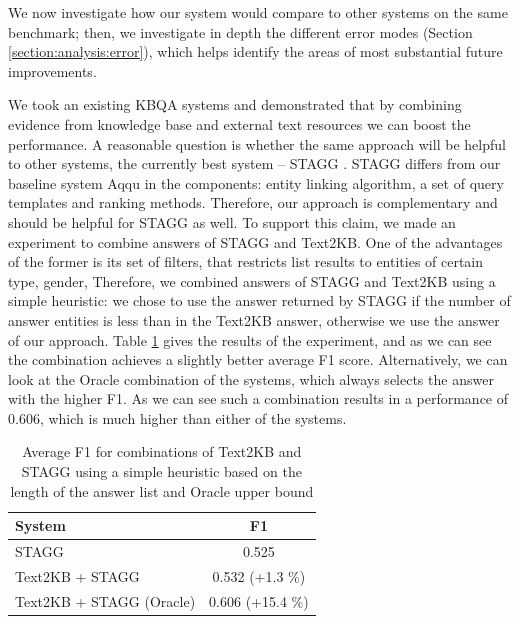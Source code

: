 We now investigate how our system would compare to other systems on the same benchmark; then, we investigate in depth the different error modes (Section \ref{section:analysis:error}), which helps identify the areas of most substantial future improvements. 

We took an existing KBQA systems and demonstrated that by combining evidence from knowledge base and external text resources we can boost the performance.
A reasonable question is whether the same approach will be helpful to other systems, \eg the currently best system -- STAGG \cite{yih2015semantic}.
STAGG differs from our baseline system Aqqu in the components: entity linking algorithm, a set of query templates and ranking methods.
Therefore, our approach is complementary and should be helpful for STAGG as well.
To support this claim, we made an experiment to combine answers of STAGG and Text2KB.
One of the advantages of the former is its set of filters, that restricts list results to entities of certain type, gender, \etc
Therefore, we combined answers of STAGG and Text2KB using a simple heuristic: we chose to use the answer returned by STAGG if the number of answer entities is less than in the Text2KB answer, otherwise we use the answer of our approach.
Table \ref{table:combine_stagg} gives the results of the experiment, and as we can see the combination achieves a slightly better average F1 score.
Alternatively, we can look at the Oracle combination of the systems, which always selects the answer with the higher F1.
As we can see such a combination results in a performance of 0.606, which is much higher than either of the systems.

\begin{table}
\centering
\begin{tabular}{| p{4.5cm} | c | }
\hline
System  & F1 \\
\hline
STAGG \cite{yih2015semantic} & 0.525\\
Text2KB + STAGG & 0.532 (+1.3 \%) \\
Text2KB + STAGG (Oracle) & 0.606 (+15.4 \%) \\
\hline
\end{tabular}
\vspace{-2mm}
\caption{Average F1 for combinations of Text2KB and STAGG using a simple heuristic based on the length of the answer list and Oracle upper bound}
\label{table:combine_stagg}
\vspace{-2mm}
\end{table}

